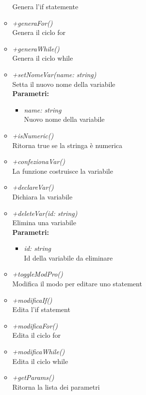 \begin{itemize}
\begin{itemize}
    		Genera l'if statemente
    		\item \emph{+generaFor()}\\
    		Genera il ciclo for
    		\item \emph{+generaWhile()}\\
    		Genera il ciclo while
    		\item \emph{+setNomeVar(name: string)}\\
    		Setta il nuovo nome della variabile\\
    		\textbf{Parametri:}
    		\begin{itemize}
    			\item \emph{name: string}\\
    			Nuovo nome della variabile
    		\end{itemize}
    		\item \emph{+isNumeric()}\\
    		Ritorna true se la stringa è numerica
    		\item \emph{+confezionaVar()}\\
    		La funzione costruisce la variabile
    		\item \emph{+declareVar()}\\
    		Dichiara la variabile
    		\item \emph{+deleteVar(id: string)}\\
    		Elimina una variabile\\
    		\textbf{Parametri:}
    		\begin{itemize}
    			\item \emph{id: string}\\
    			Id della variabile da eliminare
    		\end{itemize}
    		\item \emph{+toggleModPro()}\\
    		Modifica il modo per editare uno statement
    		\item \emph{+modificaIf()}\\
    		Edita l'if statement
    		\item \emph{+modificaFor()}\\
    		Edita il ciclo for
    		\item \emph{+modificaWhile()}\\
    		Edita il ciclo while
    		\item \emph{+getParams()}\\
    		Ritorna la lista dei parametri
		\end{itemize}
\end{itemize}